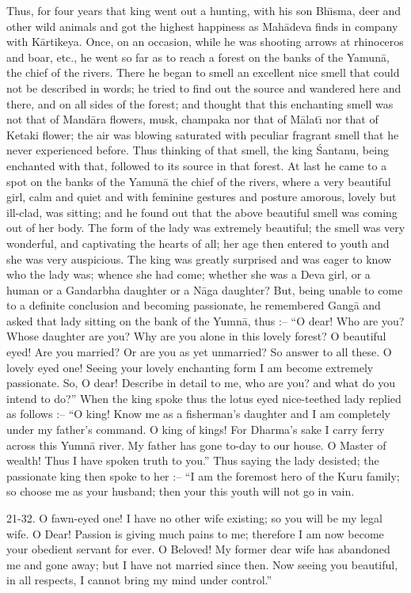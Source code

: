 Thus, for four years that king went out a hunting, with his son Bh\={\i}sma, deer and other wild animals and got the highest happiness as Mah\=adeva finds in company with K\=artikeya. Once, on an occasion, while he was shooting arrows at rhinoceros and boar, etc., he went so far as to reach a forest on the banks of the Yamun\=a, the chief of the rivers. There he began to smell an excellent nice smell that could not be described in words; he tried to find out the source and wandered here and there, and on all sides of the forest; and thought that this enchanting smell was not that of Mand\=ara flowers, musk, champaka nor that of M\=alat\={\i} nor that of Ketaki flower; the air was blowing saturated with peculiar fragrant smell that he never experienced before. Thus thinking of that smell, the king \'Santanu, being enchanted with that, followed to its source in that forest. At last he came to a spot on the banks of the Yamun\=a the chief of the rivers, where a very beautiful girl, calm and quiet and with feminine gestures and posture amorous, lovely but ill-clad, was sitting; and he found out that the above beautiful smell was coming out of her body. The form of the lady was extremely beautiful; the smell was very wonderful, and captivating the hearts of all; her age then entered to youth and she was very auspicious. The king was greatly surprised and was eager to know who the lady was; whence she had come; whether she was a Deva girl, or a human or a Gandarbha daughter or a N\=aga daughter? But, being unable to come to a definite conclusion and becoming passionate, he remembered Gang\=a and asked that lady sitting on the bank of the Yumn\=a, thus :-- ``O dear! Who are you? Whose daughter are you? Why are you alone in this lovely forest? O beautiful eyed! Are you married? Or are you as yet unmarried? So answer to all these. O lovely eyed one! Seeing your lovely enchanting form I am become extremely passionate. So, O dear! Describe in detail to me, who are you? and what do you intend to do?'' When the king spoke thus the lotus eyed nice-teethed lady replied as follows :-- ``O king! Know me as a fisherman's daughter and I am completely under my father's command. O king of kings! For Dharma's sake I carry ferry across this Yumn\=a river. My father has gone to-day to our house. O Master of wealth! Thus I have spoken truth to you.'' Thus saying the lady desisted; the passionate king then spoke to her :-- ``I am the foremost hero of the Kuru family; so choose me as your husband; then your this youth will not go in vain.

21-32. O fawn-eyed one! I have no other wife existing; so you will be my legal wife. O Dear! Passion is giving much pains to me; therefore I am now become your obedient servant for ever. O Beloved! My former dear wife has abandoned me and gone away; but I have not married since then. Now seeing you beautiful, in all respects, I cannot bring my mind under control.''

